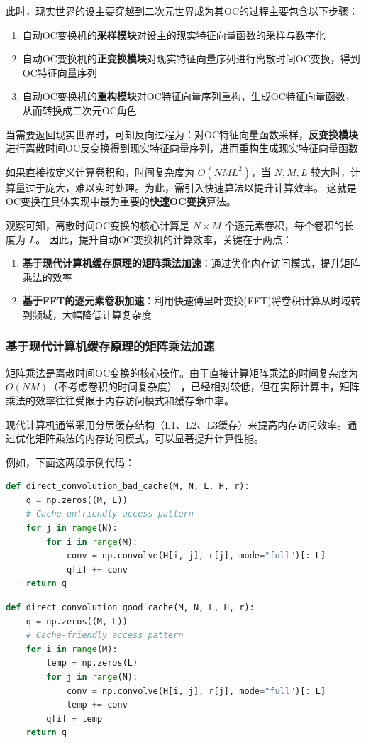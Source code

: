 此时，现实世界的设主要穿越到二次元世界成为其OC的过程主要包含以下步骤：
\begin{enumerate}
    \item 自动OC变换机的\textbf{采样模块}对设主的现实特征向量函数的采样与数字化
    \item 自动OC变换机的\textbf{正变换模块}对现实特征向量序列进行离散时间OC变换，得到OC特征向量序列
    \item 自动OC变换机的\textbf{重构模块}对OC特征向量序列重构，生成OC特征向量函数，从而转换成二次元OC角色
\end{enumerate}
当需要返回现实世界时，可知反向过程为：对OC特征向量函数采样，\textbf{反变换模块}进行离散时间OC反变换得到现实特征向量序列，进而重构生成现实特征向量函数

如果直接按定义计算卷积和，时间复杂度为 $O(NML^2)$，当 $N,M,L$ 较大时，计算量过于庞大，难以实时处理。为此，需引入快速算法以提升计算效率。
这就是OC变换在具体实现中最为重要的\textbf{快速OC变换}算法。

观察可知，离散时间OC变换的核心计算是 $N \times M$ 个逐元素卷积，每个卷积的长度为 $L$。
因此，提升自动OC变换机的计算效率，关键在于两点：
\begin{enumerate}
    \item \textbf{基于现代计算机缓存原理的矩阵乘法加速}：通过优化内存访问模式，提升矩阵乘法的效率
    \item \textbf{基于FFT的逐元素卷积加速}：利用快速傅里叶变换(FFT)将卷积计算从时域转到频域，大幅降低计算复杂度
\end{enumerate}

\subsubsection{基于现代计算机缓存原理的矩阵乘法加速}

矩阵乘法是离散时间OC变换的核心操作。由于直接计算矩阵乘法的时间复杂度为\(O(NM)\)（不考虑卷积的时间复杂度）
，已经相对较低，但在实际计算中，矩阵乘法的效率往往受限于内存访问模式和缓存命中率。

现代计算机通常采用分层缓存结构（L1、L2、L3缓存）来提高内存访问效率。通过优化矩阵乘法的内存访问模式，可以显著提升计算性能。

例如，下面这两段示例代码：
\begin{lstlisting}[language=python, caption=缓存不友好的离散时间OC变换的直接时域卷积]
def direct_convolution_bad_cache(M, N, L, H, r):
    q = np.zeros((M, L))
    # Cache-unfriendly access pattern
    for j in range(N):
        for i in range(M):
            conv = np.convolve(H[i, j], r[j], mode="full")[: L]
            q[i] += conv
    return q
\end{lstlisting}
\begin{lstlisting}[language=python, caption=缓存友好的离散时间OC变换的直接时域卷积]
def direct_convolution_good_cache(M, N, L, H, r):
    q = np.zeros((M, L))
    # Cache-friendly access pattern
    for i in range(M):
        temp = np.zeros(L)
        for j in range(N):
            conv = np.convolve(H[i, j], r[j], mode="full")[: L]
            temp += conv
        q[i] = temp
    return q
\end{lstlisting}

